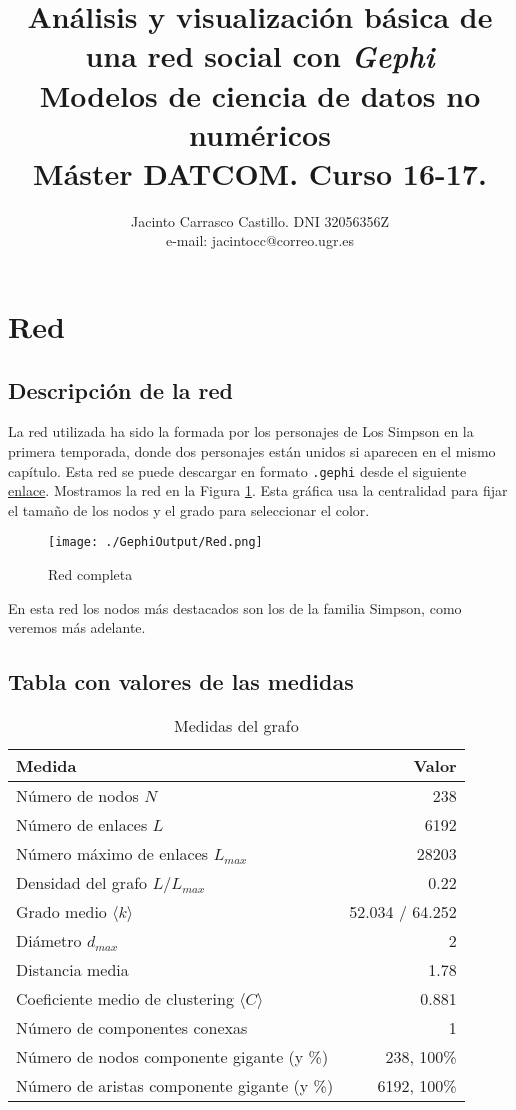 \documentclass[11pt]{article}
\author{Jacinto Carrasco Castillo. DNI 32056356Z \\  e-mail: jacintocc@correo.ugr.es}
\date{}
\title{Análisis y visualización básica de una red social con \emph{Gephi}\\\medskip
\large Modelos de ciencia de datos no numéricos \\  Máster DATCOM. Curso 16-17.}
\begin{document}
\maketitle
\tableofcontents

\newpage

\section{Red}
\label{sec:orgcc443b3}

\subsection{Descripción de la red}
\label{sec:org89545bb}

La red utilizada ha sido la formada por los personajes de Los Simpson
en la primera temporada, donde dos personajes están unidos si aparecen
en el mismo capítulo. Esta red se puede descargar en formato \texttt{.gephi}
desde el siguiente \href{https://gist.github.com/cpudney/6dfc60b2cf1d4d390e2e}{enlace}. Mostramos la red en la Figura \ref{fig:orge1d5d99}.
Esta gráfica usa la centralidad para fijar el tamaño de los nodos y el
grado para seleccionar el color.


\begin{figure}[htbp]
\centering
\texttt{[image: ./GephiOutput/Red.png]}
\caption{\label{fig:orge1d5d99}
Red completa}
\end{figure}
En esta red los nodos más destacados son los de la familia Simpson,
como veremos más adelante. 



\subsection{Tabla con valores de las medidas}
\label{sec:org60422d0}

\begin{table}[htbp]
\caption{\label{tab:orgbfc146c}
Medidas del grafo}
\centering
\begin{tabular}{lr}
Medida & Valor\\
\hline
Número de nodos \(N\) & 238\\
Número de enlaces \(L\) & 6192\\
Número máximo de enlaces \(L_{max}\) & 28203\\
Densidad del grafo \(L/L_{max}\) & 0.22\\
\hline
Grado medio \(\langle k \rangle\) & 52.034 / 64.252\\
Diámetro \(d_{max}\) & 2\\
Distancia media & 1.78\\
Coeficiente medio de clustering \(\langle C \rangle\) & 0.881\\
\hline
Número de componentes conexas & 1\\
Número de nodos componente gigante (y \%) & 238,  100\%\\
Número de aristas componente gigante (y \%) & 6192, 100\%\\
\end{tabular}
\end{table}
\end{document}
